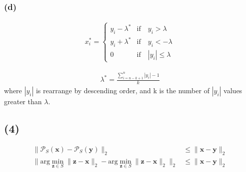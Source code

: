 \documentclass[12pt]{article}
\begin{document}
\subsubsection{(d)}

\begin{align*}
    x_i^* = \begin{cases}
        y_i - \lambda^* &\text{if}\quad y_i > \lambda \\
        y_i + \lambda^* &\text{if}\quad y_i < -\lambda \\
        0             &\text{if}\quad |y_i| \leq \lambda
    \end{cases}
\end{align*}

\begin{align*}
    \lambda^* = \frac{\sum_{i=n-k+1}^{n}|y_{i}| - 1}{k}
\end{align*}
where \(|y_i|\) is rearrange by descending order, and k is the number of \(|y_i|\) values greater than \(\lambda\).


\subsection{(4)}
\begin{align*}
    \|\mathcal{P}_S(\bm{x}) - \mathcal{P}_S(\bm{y}) \|_2 &\leq \|\bm{x} - \bm{y}\|_2 \\
    \|\text{arg} \min_{\bm{z} \in S} \|\bm{z} - \bm{x}\|_2 - \text{arg} \min_{\bm{z} \in S} \|\bm{z} - \bm{x}\|_2 \|_2 &\leq \|\bm{x} - \bm{y}\|_2
\end{align*}
\end{document}
